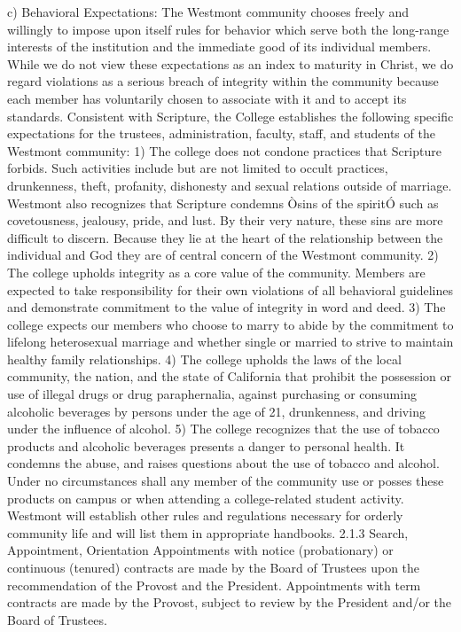 \documentclass[letterpaper, 11pt]{article}
\begin{document}
c) Behavioral Expectations:
   The Westmont community chooses freely and willingly to impose upon itself rules for behavior which serve both the long-range interests of the institution and the immediate good of its individual members.  While we do not view these expectations as an index to maturity in Christ, we do regard violations as a serious breach of integrity within the community because each member has voluntarily chosen to associate with it and to accept its standards.
   Consistent with Scripture, the College establishes the following specific expectations for the trustees, administration, faculty, staff, and students of the Westmont community:
1) The college does not condone practices that Scripture forbids.  Such activities include but are not limited to occult practices, drunkenness, theft, profanity, dishonesty and sexual relations outside of marriage.  Westmont also recognizes that Scripture condemns Òsins of the spiritÓ such as covetousness, jealousy, pride, and lust.  By their very nature, these sins are more difficult to discern.  Because they lie at the heart of the relationship between the individual and God they are of central concern of the Westmont community.
2) The college upholds integrity as a core value of the community.  Members are expected to take responsibility for their own violations of all behavioral guidelines and demonstrate commitment to the value of integrity in word and deed.
3) The college expects our members who choose to marry to abide by the commitment to lifelong heterosexual marriage and whether single or married to strive to maintain healthy family relationships.
4) The college upholds the laws of the local community, the nation, and the state of California that prohibit the possession or use of illegal drugs or drug paraphernalia, against purchasing or consuming alcoholic beverages by persons under the age of 21, drunkenness, and driving under the influence of alcohol.
5) The college recognizes that the use of tobacco products and alcoholic beverages presents a danger to personal health.  It condemns the abuse, and raises questions about the use of tobacco and alcohol.  Under no circumstances shall any member of the community use or posses these products on campus or when attending a college-related student activity.
   Westmont will establish other rules and regulations necessary for orderly community life and will list them in appropriate handbooks. 
2.1.3 Search, Appointment, Orientation
   Appointments with notice (probationary) or continuous (tenured) contracts are made by the Board of Trustees upon the recommendation of the Provost and the President. Appointments with term contracts are made by the Provost, subject to review by the President and/or the Board of Trustees.
\end{document}
